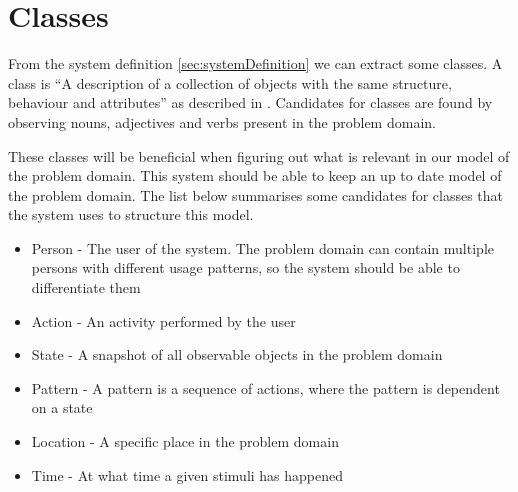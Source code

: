 \section{Classes}\label{sec:classes}
From the system definition \cref{sec:systemDefinition} we can extract some classes. A class is \enquote{A description of a collection of objects with the same structure, behaviour and attributes} as described in \cite{OOAD}. Candidates for classes are found by observing nouns, adjectives and verbs present in the problem domain.

These classes will be beneficial when figuring out what is relevant in our model of the problem domain. This system should be able to keep an up to date model of the problem domain. The list below summarises some candidates for classes that the system uses to structure this model.

\begin{itemize}
\item Person - The user of the system. The problem domain can contain multiple persons with different usage patterns, so the system should be able to differentiate them
\item Action - An activity performed by the user
\item State - A snapshot of all observable objects in the problem domain
\item Pattern - A pattern is a sequence of actions, where the pattern is dependent on a state
\item Location - A specific place in the problem domain
\item Time - At what time a given stimuli has happened
\end{itemize}
